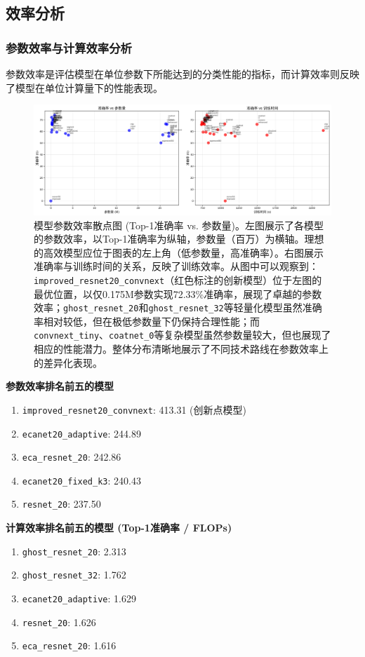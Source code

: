 \documentclass[a4paper]{article}
\begin{document}
\begin{description}
\subsection{效率分析}
\subsubsection{参数效率与计算效率分析}
参数效率是评估模型在单位参数下所能达到的分类性能的指标，而计算效率则反映了模型在单位计算量下的性能表现。

\begin{figure}[H]
    \centering
    \includegraphics[width=\textwidth]{efficiency_analysis.png}
    \caption{模型参数效率散点图 (Top-1准确率 vs. 参数量)。左图展示了各模型的参数效率，以Top-1准确率为纵轴，参数量（百万）为横轴。理想的高效模型应位于图表的左上角（低参数量，高准确率）。右图展示准确率与训练时间的关系，反映了训练效率。从图中可以观察到：\texttt{improved\_resnet20\_convnext}（红色标注的创新模型）位于左图的最优位置，以仅0.175M参数实现72.33\%准确率，展现了卓越的参数效率；\texttt{ghost\_resnet\_20}和\texttt{ghost\_resnet\_32}等轻量化模型虽然准确率相对较低，但在极低参数量下仍保持合理性能；而\texttt{convnext\_tiny}、\texttt{coatnet\_0}等复杂模型虽然参数量较大，但也展现了相应的性能潜力。整体分布清晰地展示了不同技术路线在参数效率上的差异化表现。}
    \label{fig:efficiency_analysis}
\end{figure}

\textbf{参数效率排名前五的模型}
\begin{enumerate}
    \item \texttt{improved\_resnet20\_convnext}: 413.31 (创新点模型)
    \item \texttt{ecanet20\_adaptive}: 244.89
    \item \texttt{eca\_resnet\_20}: 242.86
    \item \texttt{ecanet20\_fixed\_k3}: 240.43
    \item \texttt{resnet\_20}: 237.50
\end{enumerate}

\textbf{计算效率排名前五的模型 (Top-1准确率 / FLOPs)}
\begin{enumerate}
    \item \texttt{ghost\_resnet\_20}: 2.313
    \item \texttt{ghost\_resnet\_32}: 1.762
    \item \texttt{ecanet20\_adaptive}: 1.629
    \item \texttt{resnet\_20}: 1.626
    \item \texttt{eca\_resnet\_20}: 1.616
\end{enumerate}


\end{description}
\end{document}
